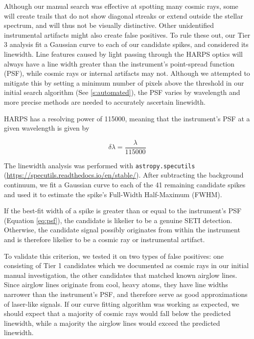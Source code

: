 \documentclass[twocolumn]{aastex701}
\begin{document}
Although our manual search was effective at spotting many cosmic rays, some will create trails that do not show diagonal streaks or extend outside the stellar spectrum, and will thus not be visually distinctive.  Other unidentified instrumental artifacts might also create false positives.  To rule these out, our Tier 3 analysis fit a Gaussian curve to each of our candidate spikes, and considered its linewidth.  Line features caused by light passing through the HARPS optics will always have a line width greater than the instrument's point-spread function (PSF), while cosmic rays or internal artifacts may not. Although we attempted to mitigate this by setting a minimum number of pixels above the threshold in our initial search algorithm (See \ref{s:automated}), the PSF varies by wavelength and more precise methods are needed to accurately ascertain linewidth.

HARPS has a resolving power \citep{HARPS_specs} of 115000, meaning that the instrument's PSF at a given wavelength is given by 

\begin{equation}
    \delta\lambda = \frac{\lambda}{115000}
    \label{eq:psf}
\end{equation}

The linewidth analysis was performed with \texttt{astropy.specutils} (\url{https://specutils.readthedocs.io/en/stable/}). After subtracting the background continuum, we fit a Gaussian curve to each of the 41 remaining candidate spikes and used it to estimate the spike's Full-Width Half-Maximum (FWHM).

If the best-fit width of a spike is greater than or equal to the instrument's PSF (Equation \ref{eq:psf}), the candidate is likelier to be a genuine SETI detection. Otherwise, the candidate signal possibly originates from within the instrument and is therefore likelier to be a cosmic ray or instrumental artifact.

To validate this criterion, we tested it on two types of false positives: one consisting of Tier 1 candidates which we documented as cosmic rays in our initial manual investigation, the other candidates that matched known airglow lines.  Since airglow lines originate from cool, heavy atoms, they have line widths narrower than the instrument's PSF, and therefore serve as good approximations of laser-like  signals.  If our curve fitting algorithm was working as expected, we should expect that a majority of cosmic rays would fall below the predicted linewidth, while a majority the airglow lines would exceed the predicted linewidth.
\end{document}
